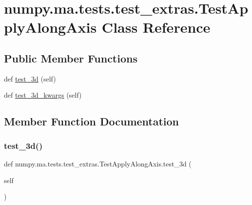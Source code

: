 \hypertarget{classnumpy_1_1ma_1_1tests_1_1test__extras_1_1TestApplyAlongAxis}{}\section{numpy.\+ma.\+tests.\+test\+\_\+extras.\+Test\+Apply\+Along\+Axis Class Reference}
\label{classnumpy_1_1ma_1_1tests_1_1test__extras_1_1TestApplyAlongAxis}
\subsection*{Public Member Functions}
\begin{DoxyCompactItemize}
\item 
def \hyperlink{classnumpy_1_1ma_1_1tests_1_1test__extras_1_1TestApplyAlongAxis_ad8d7ee3cf90b81e37eabebe4af59d5c1}{test\+\_\+3d} (self)
\item 
def \hyperlink{classnumpy_1_1ma_1_1tests_1_1test__extras_1_1TestApplyAlongAxis_ab337ead4dc21cb69eb3476baff850ed7}{test\+\_\+3d\+\_\+kwargs} (self)
\end{DoxyCompactItemize}


\subsection{Member Function Documentation}
\mbox{\label{classnumpy_1_1ma_1_1tests_1_1test__extras_1_1TestApplyAlongAxis_ad8d7ee3cf90b81e37eabebe4af59d5c1}} 
\subsubsection{\texorpdfstring{test\+\_\+3d()}{test\_3d()}}
{\footnotesize\ttfamily def numpy.\+ma.\+tests.\+test\+\_\+extras.\+Test\+Apply\+Along\+Axis.\+test\+\_\+3d (\begin{DoxyParamCaption}\item[{}]{self }\end{DoxyParamCaption})}

